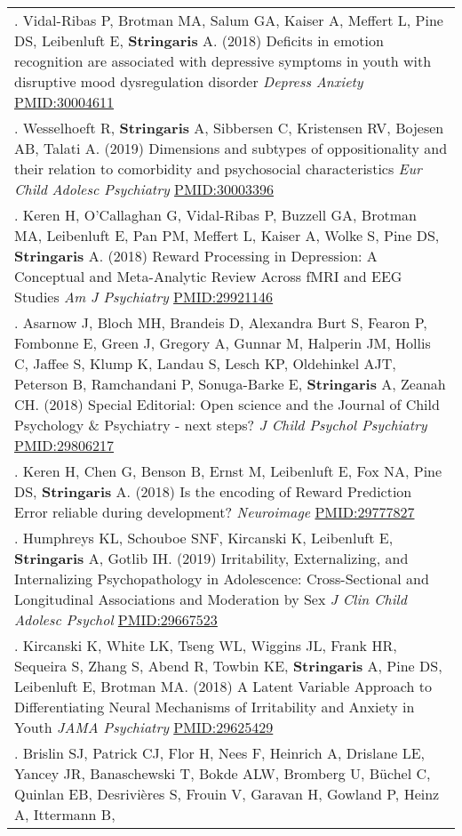 \documentclass[
]{article}
\begin{document}
\begin{longtable}[]{@{}
  >{\raggedright\arraybackslash}p{}@{}}
100. Vidal-Ribas P, Brotman MA, Salum GA, Kaiser A, Meffert L, Pine DS,
Leibenluft E, \textbf{Stringaris} A. (2018) Deficits in emotion
recognition are associated with depressive symptoms in youth with
disruptive mood dysregulation disorder \emph{Depress Anxiety}
\url{PMID:30004611} \\
101. Wesselhoeft R, \textbf{Stringaris} A, Sibbersen C, Kristensen RV,
Bojesen AB, Talati A. (2019) Dimensions and subtypes of oppositionality
and their relation to comorbidity and psychosocial characteristics
\emph{Eur Child Adolesc Psychiatry} \url{PMID:30003396} \\
102. Keren H, O'Callaghan G, Vidal-Ribas P, Buzzell GA, Brotman MA,
Leibenluft E, Pan PM, Meffert L, Kaiser A, Wolke S, Pine DS,
\textbf{Stringaris} A. (2018) Reward Processing in Depression: A
Conceptual and Meta-Analytic Review Across fMRI and EEG Studies \emph{Am
J Psychiatry} \url{PMID:29921146} \\
103. Asarnow J, Bloch MH, Brandeis D, Alexandra Burt S, Fearon P,
Fombonne E, Green J, Gregory A, Gunnar M, Halperin JM, Hollis C, Jaffee
S, Klump K, Landau S, Lesch KP, Oldehinkel AJT, Peterson B, Ramchandani
P, Sonuga-Barke E, \textbf{Stringaris} A, Zeanah CH. (2018) Special
Editorial: Open science and the Journal of Child Psychology \&
Psychiatry - next steps? \emph{J Child Psychol Psychiatry}
\url{PMID:29806217} \\
104. Keren H, Chen G, Benson B, Ernst M, Leibenluft E, Fox NA, Pine DS,
\textbf{Stringaris} A. (2018) Is the encoding of Reward Prediction Error
reliable during development? \emph{Neuroimage} \url{PMID:29777827} \\
105. Humphreys KL, Schouboe SNF, Kircanski K, Leibenluft E,
\textbf{Stringaris} A, Gotlib IH. (2019) Irritability, Externalizing,
and Internalizing Psychopathology in Adolescence: Cross-Sectional and
Longitudinal Associations and Moderation by Sex \emph{J Clin Child
Adolesc Psychol} \url{PMID:29667523} \\
106. Kircanski K, White LK, Tseng WL, Wiggins JL, Frank HR, Sequeira S,
Zhang S, Abend R, Towbin KE, \textbf{Stringaris} A, Pine DS, Leibenluft
E, Brotman MA. (2018) A Latent Variable Approach to Differentiating
Neural Mechanisms of Irritability and Anxiety in Youth \emph{JAMA
Psychiatry} \url{PMID:29625429} \\
107. Brislin SJ, Patrick CJ, Flor H, Nees F, Heinrich A, Drislane LE,
Yancey JR, Banaschewski T, Bokde ALW, Bromberg U, Büchel C, Quinlan EB,
Desrivières S, Frouin V, Garavan H, Gowland P, Heinz A, Ittermann B,

\end{longtable}
\end{document}

